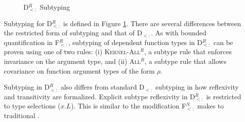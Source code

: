 \documentclass[runningheads, anon]{llncs}
\begin{document}
\begin{figure}[t]
\small
{}
\caption{D$_{<:}^R$ Subtyping}
\label{f:dsubR:subtyping}
\end{figure}

Subtyping for D$_{<:}^R$ is defined in Figure \ref{f:dsubR:subtyping}. There are several differences between the 
restricted form of subtyping and that of D$_{<:}$. As with bounded quantification in F$_{<:}^R$, subtyping of 
dependent function types in D$_{<:}^R$ can be proven using one of two rules: (i) \textsc{Kernel-All$^R$}, a subtype
rule that enforces invariance on the argument type, and (ii) \textsc{All$^R$}, a subtype rule that allows covariance
on function argument types of the form $\rho$. 

Subtyping in D$_{<:}^R$ also differs from standard D$_{<:}$ subtyping in how reflexivity and transitivity are formalized.
Explicit subtype reflexivity in D$_{<:}^R$ is restricted to type selections ($x.L$). This is similar to the modification F$_{<:}^N$
makes to traditional \Fsub. 
\end{document}
